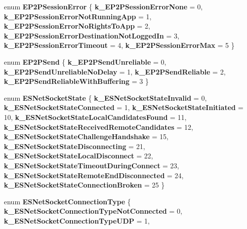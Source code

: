 \begin{DoxyCompactItemize}
enum {\bfseries E\+P2\+P\+Session\+Error} \{ \newline
{\bfseries k\+\_\+\+E\+P2\+P\+Session\+Error\+None} = 0, 
{\bfseries k\+\_\+\+E\+P2\+P\+Session\+Error\+Not\+Running\+App} = 1, 
{\bfseries k\+\_\+\+E\+P2\+P\+Session\+Error\+No\+Rights\+To\+App} = 2, 
{\bfseries k\+\_\+\+E\+P2\+P\+Session\+Error\+Destination\+Not\+Logged\+In} = 3, 
\newline
{\bfseries k\+\_\+\+E\+P2\+P\+Session\+Error\+Timeout} = 4, 
{\bfseries k\+\_\+\+E\+P2\+P\+Session\+Error\+Max} = 5
 \}
\item 
\mbox{\label{namespace_valve_1_1_steamworks_afaf52a3fe3edfcee923d94dedba17814}} 
enum {\bfseries E\+P2\+P\+Send} \{ {\bfseries k\+\_\+\+E\+P2\+P\+Send\+Unreliable} = 0, 
{\bfseries k\+\_\+\+E\+P2\+P\+Send\+Unreliable\+No\+Delay} = 1, 
{\bfseries k\+\_\+\+E\+P2\+P\+Send\+Reliable} = 2, 
{\bfseries k\+\_\+\+E\+P2\+P\+Send\+Reliable\+With\+Buffering} = 3
 \}
\item 
\mbox{\label{namespace_valve_1_1_steamworks_af62412d4d3fdfebc402e5dd992497d51}} 
enum {\bfseries E\+S\+Net\+Socket\+State} \{ \newline
{\bfseries k\+\_\+\+E\+S\+Net\+Socket\+State\+Invalid} = 0, 
{\bfseries k\+\_\+\+E\+S\+Net\+Socket\+State\+Connected} = 1, 
{\bfseries k\+\_\+\+E\+S\+Net\+Socket\+State\+Initiated} = 10, 
{\bfseries k\+\_\+\+E\+S\+Net\+Socket\+State\+Local\+Candidates\+Found} = 11, 
\newline
{\bfseries k\+\_\+\+E\+S\+Net\+Socket\+State\+Received\+Remote\+Candidates} = 12, 
{\bfseries k\+\_\+\+E\+S\+Net\+Socket\+State\+Challenge\+Handshake} = 15, 
{\bfseries k\+\_\+\+E\+S\+Net\+Socket\+State\+Disconnecting} = 21, 
{\bfseries k\+\_\+\+E\+S\+Net\+Socket\+State\+Local\+Disconnect} = 22, 
\newline
{\bfseries k\+\_\+\+E\+S\+Net\+Socket\+State\+Timeout\+During\+Connect} = 23, 
{\bfseries k\+\_\+\+E\+S\+Net\+Socket\+State\+Remote\+End\+Disconnected} = 24, 
{\bfseries k\+\_\+\+E\+S\+Net\+Socket\+State\+Connection\+Broken} = 25
 \}
\item 
\mbox{\label{namespace_valve_1_1_steamworks_ab4b13623fc1bd48b8e9dcfae3fc35109}} 
enum {\bfseries E\+S\+Net\+Socket\+Connection\+Type} \{ {\bfseries k\+\_\+\+E\+S\+Net\+Socket\+Connection\+Type\+Not\+Connected} = 0, 
{\bfseries k\+\_\+\+E\+S\+Net\+Socket\+Connection\+Type\+U\+DP} = 1, 

\end{DoxyCompactItemize}
